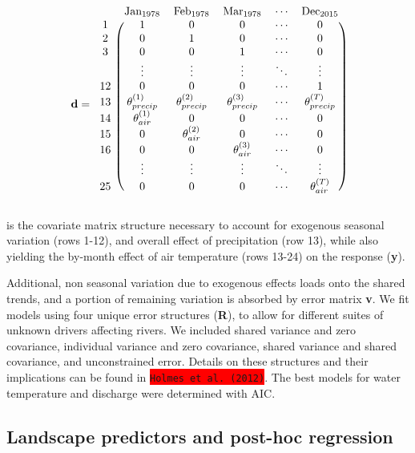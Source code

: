 \documentclass[notitlepage]{article}
\begin{document}
$$
\textbf{d} = \begin{blockarray}{cccccc}
& \textrm{Jan}_{1978} & \textrm{Feb}_{1978} & \textrm{Mar}_{1978} & \cdots & \textrm{Dec}_{2015} \\
\begin{block}{c(ccccc)}
    1 & 1 & 0 & 0 & \cdots & 0 \\
    2 & 0 & 1 & 0 & \cdots & 0 \\
    3 & 0 & 0 & 1 & \cdots & 0 \\
      & \vdots & \vdots & \vdots & \ddots & \vdots \\
    12 & 0 & 0 & 0 & \cdots & 1 \\
    13 & \theta_{precip}^{(1)} & \theta_{precip}^{(2)} & \theta_{precip}^{(3)} & \cdots & \theta_{precip}^{(T)} \\
    14 & \theta_{air}^{(1)} & 0 & 0 & \cdots & 0 \\
    15 & 0 & \theta_{air}^{(2)} & 0 & \cdots & 0 \\
    16 & 0 & 0 & \theta_{air}^{(3)} & \cdots & 0 \\
      & \vdots & \vdots & \vdots & \ddots & \vdots \\
    25 & 0 & 0 & 0 & \cdots & \theta_{air}^{(T)} \\
\end{block}
\end{blockarray}
$$

is the covariate matrix structure necessary to account for exogenous seasonal variation (rows 1-12), and overall effect of precipitation (row 13), while also yielding the by-month effect of air temperature (rows 13-24) on the response (\textbf{y}).

Additional, non seasonal variation due to exogenous effects loads onto the shared trends, and a portion of remaining variation is absorbed by error matrix \textbf{v}. We fit models using four unique error structures (\textbf{R}), to allow for different suites of unknown drivers affecting rivers. We included shared variance and zero covariance, individual variance and zero covariance, shared variance and shared covariance, and unconstrained error. Details on these structures and their implications can be found in \colorbox{red}{\lstinline{Holmes et al. (2012)}}. The best models for water temperature and discharge were determined with AIC.

\subsection*{Landscape predictors and post-hoc regression}
\end{document}
